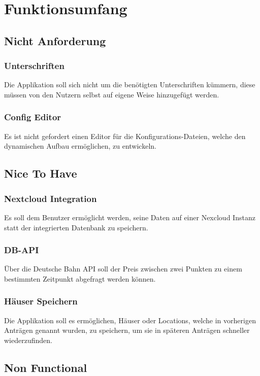 \chapter{Funktionsumfang}\label{ch:funktionsumfang}

\section{Nicht Anforderung}\label{sec:nicht-anforderung}
\subsection{Unterschriften}\label{subsec:unterschriften}
Die Applikation soll sich nicht um die benötigten Unterschriften kümmern,
diese müssen von den Nutzern selbst auf eigene Weise hinzugefügt werden.
\subsection{Config Editor}\label{subsec:config-editor}
Es ist nicht gefordert einen Editor für die Konfigurations-Dateien, welche den dynamischen Aufbau ermöglichen, zu entwickeln.

\section{Nice To Have}\label{sec:nice-to-have}
\subsection{Nextcloud Integration}\label{subsec:nextcloud-integration}
Es soll dem Benutzer ermöglicht werden, seine Daten auf einer Nexcloud Instanz statt der integrierten Datenbank zu speichern.
\subsection{DB-API}\label{subsec:db-api}
Über die Deutsche Bahn API soll der Preis zwischen zwei Punkten zu einem bestimmten Zeitpunkt abgefragt werden können.
\subsection{Häuser Speichern}\label{subsec:hauser-speichern}
Die Applikation soll es ermöglichen, Häuser oder Locations, welche in vorherigen Anträgen genannt wurden, zu speichern,
um sie in späteren Anträgen schneller wiederzufinden.

\section{Non Functional}\label{sec:non-functional}
